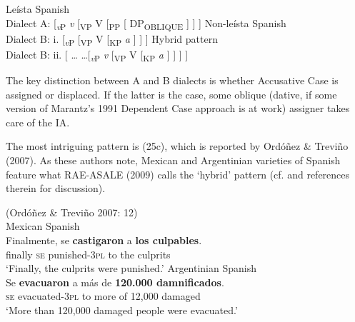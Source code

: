 \documentclass[output=paper]{langsci/langscibook}
\begin{document}
\ea%
    \label{ex:gallego:25}
    \ea Leísta Spanish\\
     Dialect A:   [\textit{\textsubscript{v}}\textsubscript{P} \textit{v} [\textsubscript{VP} V  [\textsubscript{PP}    [ DP\textsubscript{OBLIQUE} \ConnectHead{]} ] ] ] 
    \ex Non-leísta Spanish\\
    Dialect B:  i.  [\textit{\textsubscript{v}}\textsubscript{P}  [\textsubscript{VP} V [\textsubscript{KP} \textit{a}  ] ] ]
    \ex Hybrid pattern\\
    Dialect B:  ii.   [ \ldots\xspace {} \ldots\xspace [\textit{\textsubscript{v}}\textsubscript{P} \textit{v} [\textsubscript{VP} V [\textsubscript{KP} \textit{a}  ] ] ] ]
    \z
\z    



The key distinction between A and B dialects is whether Accusative Case is assigned or displaced. If the latter is the case, some oblique (dative, if some version of Marantz’s 1991 Dependent Case approach is at work) assigner takes care of the IA.

The most intriguing pattern is (25c), which is reported by Ordóñez \& Treviño (2007). As these authors note, Mexican and Argentinian varieties of Spanish feature what RAE-ASALE (2009) calls the ‘hybrid’ pattern (cf. \citealt{Planells2017} and references therein for discussion).

\ea%
    (Ordóñez \& Treviño 2007: 12)\\
    \ea Mexican Spanish\label{ex:gallego:26}\\
    \gll Finalmente, se  \textbf{castigaron}       a  \textbf{los culpables}.        \\
         finally         \textsc{se}   punished-\textsc{3pl}   to the culprits\\
    \glt ‘Finally, the culprits were punished.’
    \ex Argentinian Spanish\\
    \gll Se  \textbf{evacuaron}    a más de \textbf{120.000 damnificados}.              \\
         \textsc{se}   evacuated-\textsc{3pl} to more of 12,000 damaged\\
    \glt  ‘More than 120,000 damaged people were evacuated.’
    \z
\z
\end{document}
